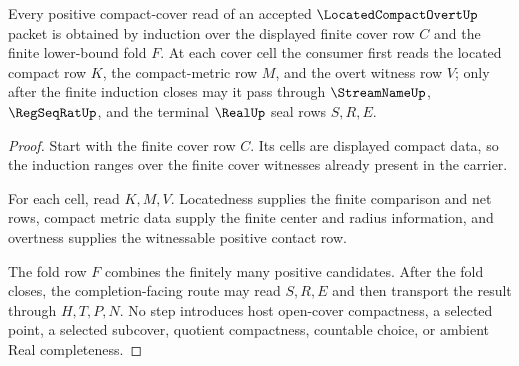 \begin{theorem}
\label{thm:located-compact-overt-finite-positive-cover-induction}
Every positive compact-cover read of an accepted $\LocatedCompactOvertUp$ packet is obtained by induction over the displayed finite cover row $C$ and the finite lower-bound fold $F$. At each cover cell the consumer first reads the located compact row $K$, the compact-metric row $M$, and the overt witness row $V$; only after the finite induction closes may it pass through $\StreamNameUp$, $\RegSeqRatUp$, and the terminal $\RealUp$ seal rows $S,R,E$.
\end{theorem}
\begin{proof}
Start with the finite cover row $C$. Its cells are displayed compact data, so the induction ranges over the finite cover witnesses already present in the carrier.

For each cell, read $K,M,V$. Locatedness supplies the finite comparison and net rows, compact metric data supply the finite center and radius information, and overtness supplies the witnessable positive contact row.

The fold row $F$ combines the finitely many positive candidates. After the fold closes, the completion-facing route may read $S,R,E$ and then transport the result through $H,T,P,N$. No step introduces host open-cover compactness, a selected point, a selected subcover, quotient compactness, countable choice, or ambient Real completeness.
\end{proof}



